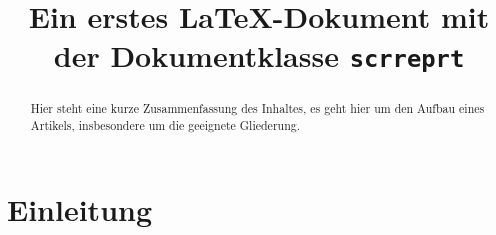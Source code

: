 \documentclass[ngerman,               %
               a4paper,               %
               fleqn,                 %
                     ]{scrreprt}
\title{Ein erstes \LaTeX-Dokument mit der Dokumentklasse \texttt{scrreprt}}       %
\begin{document}
  \maketitle                          %

  \begin{abstract}                    %
    Hier steht eine kurze Zusammenfassung des Inhaltes, es geht hier um den Aufbau eines Artikels, insbesondere um die geeignete Gliederung.
  \end{abstract}

  \tableofcontents


  \chapter{Einleitung}   %
\end{document}
